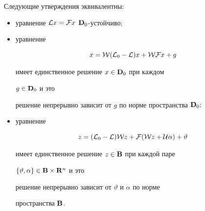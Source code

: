 \begin{thm}


Следующие утверждения эквивалентны$:$


\begin{itemize}


\item[а)] уравнение ${\cal L}x={\cal F}x$\; $\bold {D}_0$-устойчиво$;$


\item[б)] уравнение


\begin{equation}


x={\cal W}({\cal L}_0-{\cal L})x+{\cal W}{\cal F}x+g


\end{equation}


имеет единственное решение $x\in\bold {D}_0$ при каждом


$g\in\bold {D}_0$ и это


решение непрерывно зависит от $g$ по норме пространства $\bold {D}_0;$


\item[в)] уравнение


\begin{equation}


z=({\cal L}_0-{\cal L}){\cal W}z+{\cal F}({\cal W}z+{\cal U}\alpha)


+\vartheta


\end{equation}


имеет единственное решение $z\in\bold {B}$ при каждой паре


$\{\vartheta,\alpha\}\in\bold {B}\times\bold {R}^n$ и это


решение непрерывно зависит от $\vartheta$ и $\alpha$ по норме


пространства $\bold {B}$.


\end{itemize}


\end{thm}





